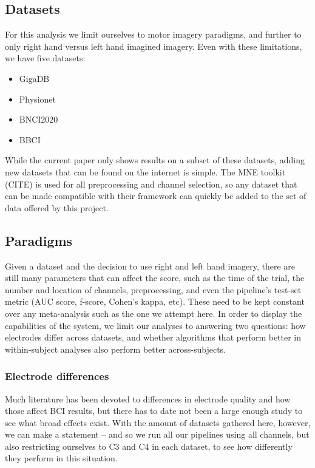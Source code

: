\subsection{Datasets}

For this analysis we limit ourselves to motor imagery paradigms, and further to only right hand versus left hand imagined imagery. Even with these limitations, we have five datasets:

\begin{itemize}
\item GigaDB \cite{Cho2017}
\item Physionet\cite{Schalk2004,Goldberger2000} 
\item BNCI2020
\item BBCI \cite{Blankertz2007,Shin2017}
\end{itemize}

While the current paper only shows results on a subset of these datasets, adding new datasets that can be found on the internet is simple. The MNE toolkit (CITE) is used for all preprocessing and channel selection, so any dataset that can be made compatible with their framework can quickly be added to the set of data offered by this project.
\subsection{Paradigms}

Given a dataset and the decision to use right and left hand imagery, there are
still many parameters that can affect the score, such as the time of the trial,
the number and location of channels, preprocessing, and even the pipeline's
test-set metric (AUC score, f-score, Cohen's kappa, etc). These need to be kept
constant over any meta-analysis such as the one we attempt here. In order to
display the capabilities of the system, we limit our analyses to answering two questions:
how electrodes differ across datasets, and whether algorithms that perform better in within-subject analyses also perform better across-subjects.

\subsubsection{Electrode differences}
Much literature has been devoted to differences in electrode quality and how those affect BCI results, but there has to date not been a large enough study to see what broad effects exist. With the amount of datasets gathered here, however, we can make a statement -- and so we run all our pipelines using all channels, but also restricting ourselves to C3 and C4 in each dataset, to see how differently they perform in this situation.

